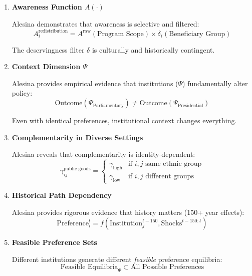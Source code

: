 \begin{enumerate}

\item \textbf{Awareness Function $A(\cdot)$}

   Alesina demonstrates that awareness is selective and filtered:
   \begin{equation}
   A_i^{\text{redistribution}} = A^{\text{raw}}(\text{Program Scope}) \times \delta_i(\text{Beneficiary Group})
   \end{equation}

   The deservingness filter $\delta$ is culturally and historically contingent.

\item \textbf{Context Dimension $\Psi$}

   Alesina provides empirical evidence that institutions ($\Psi$) fundamentally alter policy:
   \begin{equation}
   \text{Outcome}(\Psi_{\text{Parliamentary}}) \neq \text{Outcome}(\Psi_{\text{Presidential}})
   \end{equation}

   Even with identical preferences, institutional context changes everything.

\item \textbf{Complementarity in Diverse Settings}

   Alesina reveals that complementarity is identity-dependent:
   \begin{equation}
   \gamma^{\text{public goods}}_{ij} = \begin{cases}
   \gamma_{\text{high}} & \text{if } i, j \text{ same ethnic group} \\
   \gamma_{\text{low}} & \text{if } i, j \text{ different groups}
   \end{cases}
   \end{equation}

\item \textbf{Historical Path Dependency}

   Alesina provides rigorous evidence that history matters (150+ year effects):
   \begin{equation}
   \text{Preference}_i^t = f(\text{Institution}_{j}^{t-150}, \text{Shocks}^{t-150:t})
   \end{equation}

\item \textbf{Feasible Preference Sets}

   Different institutions generate different \emph{feasible} preference equilibria:
   \begin{equation}
   \text{Feasible Equilibria}_{\Psi} \subset \text{All Possible Preferences}
   \end{equation}

\end{enumerate}

